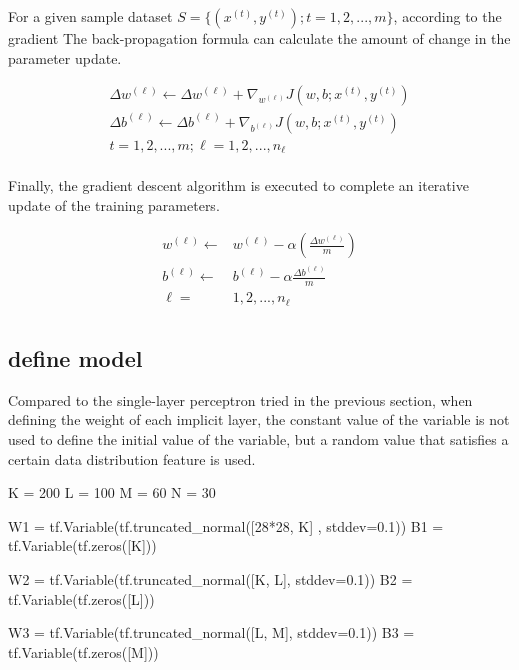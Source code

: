 \begin{content}
\begin{content}
For a given sample dataset $ S = \{ ({x^{(t)}}, {y^{(t)}});t = 1,2,...,m\} $, according to the gradient The back-propagation formula can calculate the amount of change in the parameter update.

\[\begin{aligned}
  \Delta {w^{(\ell )}} \leftarrow \Delta {w^{(\ell )}} + {\nabla _{{w^{(\ell )}}}}J\left( {w ,b;{x^{(t)}},{y^{(t)}}} \right) \\ 
  \Delta {b^{(\ell )}} \leftarrow \Delta {b^{(\ell )}} + {\nabla _{{b^{(\ell )}}}}J\left( {w ,b;{x^{(t)}},{y^{(t)}}} \right) \\ 
  t = 1,2,...,m;\ell = 1,2,...,{n_\ell } \\ 
\end{aligned} \]

Finally, the gradient descent algorithm is executed to complete an iterative update of the training parameters.

\[\begin{aligned}
  {w^{(\ell )}} \leftarrow & {w^{(\ell )}} - \alpha \left( {\frac{{\Delta {w^{(\ell )}}}}{m }} \right) \\ 
  {b^{(\ell )}} \leftarrow & {b^{(\ell )}} - \alpha \frac{{\Delta {b^{(\ell )}}}}{m} \\ 
  \ell = & 1,2,...,{n_\ell } \\
\end{aligned} \]

\subsection{define model}

Compared to the single-layer perceptron tried in the previous section, when defining the weight of each implicit layer, the constant value of the variable is not used to define the initial value of the variable, but a random value that satisfies a certain data distribution feature is used.

\begin{leftbar}
\begin{python}
K = 200
L = 100
M = 60
N = 30

W1 = tf.Variable(tf.truncated_normal([28*28, K] , stddev=0.1)) 
B1 = tf.Variable(tf.zeros([K]))

W2 = tf.Variable(tf.truncated_normal([K, L], stddev=0.1))
B2 = tf.Variable(tf.zeros([L]))

W3 = tf.Variable(tf.truncated_normal([L, M], stddev=0.1)) 
B3 = tf.Variable(tf.zeros([M]))


\end{python}
\end{leftbar}
\end{content}
\end{content}
